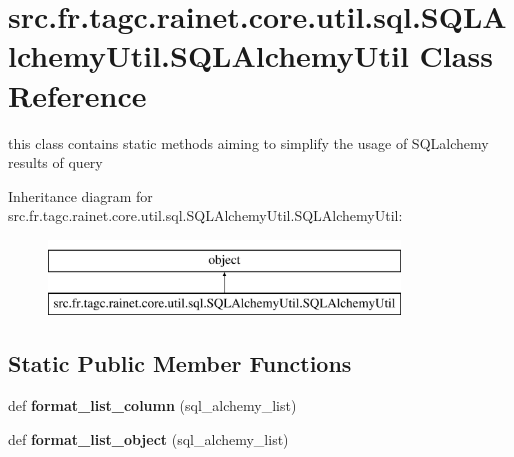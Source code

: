 \hypertarget{classsrc_1_1fr_1_1tagc_1_1rainet_1_1core_1_1util_1_1sql_1_1SQLAlchemyUtil_1_1SQLAlchemyUtil}{}\section{src.\+fr.\+tagc.\+rainet.\+core.\+util.\+sql.\+S\+Q\+L\+Alchemy\+Util.\+S\+Q\+L\+Alchemy\+Util Class Reference}
\label{classsrc_1_1fr_1_1tagc_1_1rainet_1_1core_1_1util_1_1sql_1_1SQLAlchemyUtil_1_1SQLAlchemyUtil}


this class contains static methods aiming to simplify the usage of S\+Q\+Lalchemy results of query  


Inheritance diagram for src.\+fr.\+tagc.\+rainet.\+core.\+util.\+sql.\+S\+Q\+L\+Alchemy\+Util.\+S\+Q\+L\+Alchemy\+Util\+:\begin{figure}[H]
\begin{center}
\leavevmode
\includegraphics[height=2.000000cm]{classsrc_1_1fr_1_1tagc_1_1rainet_1_1core_1_1util_1_1sql_1_1SQLAlchemyUtil_1_1SQLAlchemyUtil}
\end{center}
\end{figure}
\subsection*{Static Public Member Functions}
\begin{DoxyCompactItemize}
\item 
\hypertarget{classsrc_1_1fr_1_1tagc_1_1rainet_1_1core_1_1util_1_1sql_1_1SQLAlchemyUtil_1_1SQLAlchemyUtil_a102b42a21b6a74a46f7cf150ac3c8e2c}{}def {\bfseries format\+\_\+list\+\_\+column} (sql\+\_\+alchemy\+\_\+list)\label{classsrc_1_1fr_1_1tagc_1_1rainet_1_1core_1_1util_1_1sql_1_1SQLAlchemyUtil_1_1SQLAlchemyUtil_a102b42a21b6a74a46f7cf150ac3c8e2c}

\item 
\hypertarget{classsrc_1_1fr_1_1tagc_1_1rainet_1_1core_1_1util_1_1sql_1_1SQLAlchemyUtil_1_1SQLAlchemyUtil_a5d8c69d5c129773169fd4b754b6c4243}{}def {\bfseries format\+\_\+list\+\_\+object} (sql\+\_\+alchemy\+\_\+list)\label{classsrc_1_1fr_1_1tagc_1_1rainet_1_1core_1_1util_1_1sql_1_1SQLAlchemyUtil_1_1SQLAlchemyUtil_a5d8c69d5c129773169fd4b754b6c4243}

\end{DoxyCompactItemize}


